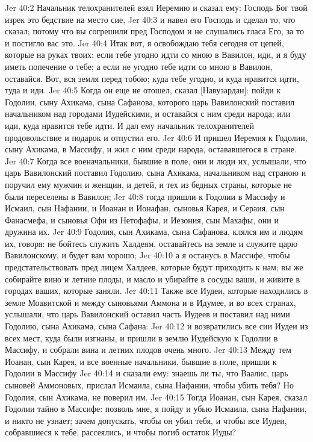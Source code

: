 Jer 40:2  Начальник телохранителей взял Иеремию и сказал ему: Господь Бог твой изрек это бедствие на место сие,
Jer 40:3  и навел его Господь и сделал то, что сказал; потому что вы согрешили пред Господом и не слушались гласа Его, за то и постигло вас это.
Jer 40:4  Итак вот, я освобождаю тебя сегодня от цепей, которые на руках твоих: если тебе угодно идти со мною в Вавилон, иди, и я буду иметь попечение о тебе; а если не угодно тебе идти со мною в Вавилон, оставайся. Вот, вся земля перед тобою; куда тебе угодно, и куда нравится идти, туда и иди.
Jer 40:5  Когда он еще не отошел, сказал [Навузардан]: пойди к Годолии, сыну Ахикама, сына Сафанова, которого царь Вавилонский поставил начальником над городами Иудейскими, и оставайся с ним среди народа; или иди, куда нравится тебе идти. И дал ему начальник телохранителей продовольствие и подарок и отпустил его.
Jer 40:6  И пришел Иеремия к Годолии, сыну Ахикама, в Массифу, и жил с ним среди народа, остававшегося в стране.
Jer 40:7  Когда все военачальники, бывшие в поле, они и люди их, услышали, что царь Вавилонский поставил Годолию, сына Ахикама, начальником над страною и поручил ему мужчин и женщин, и детей, и тех из бедных страны, которые не были переселены в Вавилон;
Jer 40:8  тогда пришли к Годолии в Массифу и Исмаил, сын Нафании, и Иоанан и Ионафан, сыновья Карея, и Сераия, сын Фанасмефа, и сыновья Офи из Нетофафы, и Иезония, сын Махафы, они и дружина их.
Jer 40:9  Годолия, сын Ахикама, сына Сафанова, клялся им и людям их, говоря: не бойтесь служить Халдеям, оставайтесь на земле и служите царю Вавилонскому, и будет вам хорошо;
Jer 40:10  а я останусь в Массифе, чтобы предстательствовать пред лицем Халдеев, которые будут приходить к нам; вы же собирайте вино и летние плоды, и масло и убирайте в сосуды ваши, и живите в городах ваших, которые заняли.
Jer 40:11  Также все Иудеи, которые находились в земле Моавитской и между сыновьями Аммона и в Идумее, и во всех странах, услышали, что царь Вавилонский оставил часть Иудеев и поставил над ними Годолию, сына Ахикама, сына Сафана:
Jer 40:12  и возвратились все сии Иудеи из всех мест, куда были изгнаны, и пришли в землю Иудейскую к Годолии в Массифу, и собрали вина и летних плодов очень много.
Jer 40:13  Между тем Иоанан, сын Карея, и все военные начальники, бывшие в поле, пришли к Годолии в Массифу
Jer 40:14  и сказали ему: знаешь ли ты, что Ваалис, царь сыновей Аммоновых, прислал Исмаила, сына Нафании, чтобы убить тебя? Но Годолия, сын Ахикама, не поверил им.
Jer 40:15  Тогда Иоанан, сын Карея, сказал Годолии тайно в Массифе: позволь мне, я пойду и убью Исмаила, сына Нафании, и никто не узнает; зачем допускать, чтобы он убил тебя, и чтобы все Иудеи, собравшиеся к тебе, рассеялись, и чтобы погиб остаток Иуды?
